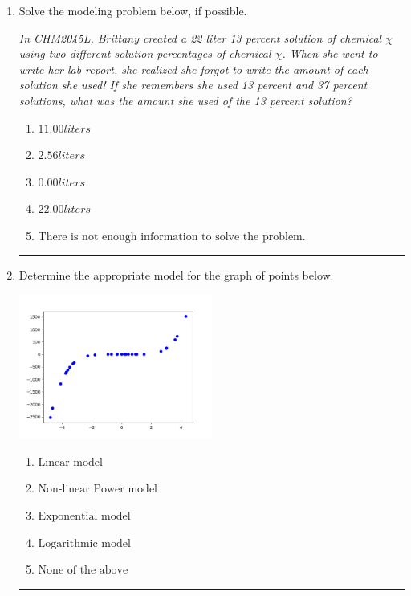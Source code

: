 \documentclass[14pt]{extbook}
\newcommand{\litem}[1]{\item#1\hspace*{-1cm}\rule{\textwidth}{0.4pt}}
\begin{document}
\begin{enumerate}
{\begin{enumerate}[label=\Alph*.]
\end{enumerate} }
\litem{
Solve the modeling problem below, if possible.
\begin{center}
    \textit{ In CHM2045L, Brittany created a 22 liter 13 percent solution of chemical $\chi$ using two different solution percentages of chemical $\chi$. When she went to write her lab report, she realized she forgot to write the amount of each solution she used! If she remembers she used 13 percent and 37 percent solutions, what was the amount she used of the 13 percent solution? }
\end{center}
\begin{enumerate}[label=\Alph*.]
\item \( 11.00 liters \)
\item \( 2.56 liters \)
\item \( 0.00 liters \)
\item \( 22.00 liters \)
\item \( \text{There is not enough information to solve the problem.} \)

\end{enumerate} }
\litem{
Determine the appropriate model for the graph of points below.
\begin{center}
    \includegraphics[width=0.5\textwidth]{../Figures/identifyModelGraph12CopyC.png}
\end{center}
\begin{enumerate}[label=\Alph*.]
\item \( \text{Linear model} \)
\item \( \text{Non-linear Power model} \)
\item \( \text{Exponential model} \)
\item \( \text{Logarithmic model} \)
\item \( \text{None of the above} \)

\end{enumerate} }
\end{enumerate}
\end{document}
